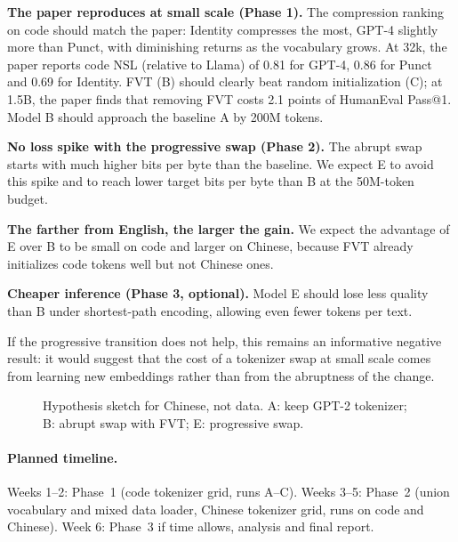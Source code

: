 \documentclass[11pt,a4paper]{article}
\begin{document}
\begin{description}[leftmargin=0.9cm,style=nextline]
  \item[H1] \textbf{The paper reproduces at small scale (Phase 1).} The compression ranking on code should match the paper: Identity compresses the most, GPT-4 slightly more than Punct, with diminishing returns as the vocabulary grows. At 32k, the paper reports code NSL (relative to Llama) of 0.81 for GPT-4, 0.86 for Punct and 0.69 for Identity. FVT (B) should clearly beat random initialization (C); at 1.5B, the paper finds that removing FVT costs 2.1 points of HumanEval Pass@1. Model B should approach the baseline A by 200M tokens.
  \item[H2] \textbf{No loss spike with the progressive swap (Phase 2).} The abrupt swap starts with much higher bits per byte than the baseline. We expect E to avoid this spike and to reach lower target bits per byte than B at the 50M-token budget.
  \item[H3] \textbf{The farther from English, the larger the gain.} We expect the advantage of E over B to be small on code and larger on Chinese, because FVT already initializes code tokens well but not Chinese ones.
  \item[H4] \textbf{Cheaper inference (Phase 3, optional).} Model E should lose less quality than B under shortest-path encoding, allowing even fewer tokens per text.
\end{description}
If the progressive transition does not help, this remains an informative negative result: it would suggest that the cost of a tokenizer swap at small scale comes from learning new embeddings rather than from the abruptness of the change.

\begin{figure}[h]
\centering
{}
\caption{Hypothesis sketch for Chinese, not data. A: keep GPT-2 tokenizer; B: abrupt swap with FVT; E: progressive swap.}
\label{fig:sketch}
\end{figure}

\paragraph{Planned timeline.} Weeks 1--2: Phase~1 (code tokenizer grid, runs A--C). Weeks 3--5: Phase~2 (union vocabulary and mixed data loader, Chinese tokenizer grid, runs on code and Chinese). Week 6: Phase~3 if time allows, analysis and final report.



\end{document}
